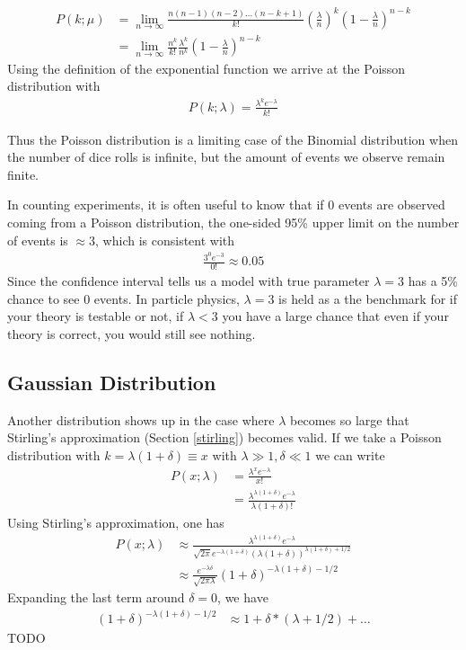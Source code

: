\begin{align}
P(k; \mu) &= \lim_{n\to \infty} \frac{n(n-1)(n-2)...(n-k+1)}{k!}\left(\frac{\lambda}{n}\right)^k\left(1-\frac{\lambda}{n}\right)^{n-k}\\
&= \lim_{n\to \infty}\frac{n^k}{k!}\frac{\lambda^k}{n^k}\left(1-\frac{\lambda}{n}\right)^{n-k}
\end{align}
Using the definition of the exponential function we arrive at the Poisson distribution with
\begin{align}
P(k; \lambda) = \frac{\lambda^ke^{-\lambda}}{k!}
\end{align}

Thus the Poisson distribution is a limiting case of the Binomial distribution when the number of dice rolls is infinite, but the amount of events we observe remain finite.

In counting experiments, it is often useful to know that if 0 events are observed coming from a Poisson distribution, the one-sided 95\% upper limit on the number of events is $\approx 3$, which is consistent with
\begin{align}
	\frac{3^0e^{-3}}{0!} \approx 0.05
\end{align}
Since the confidence interval tells us a model with true parameter $\lambda=3$ has a 5\% chance to see 0 events. In particle physics, $\lambda=3$ is held as a the benchmark for if your theory is testable or not, if $\lambda < 3$ you have a large chance that even if your theory is correct, you would still see nothing. 



\subsection{Gaussian Distribution}
Another distribution shows up in the case where $\lambda$ becomes so large that Stirling's approximation (Section \ref{stirling}) becomes valid. If we take a Poisson distribution with  $k = \lambda(1+\delta) \equiv x$ with $\lambda \gg 1, \delta \ll 1$ we can write
\begin{align}
	P(x; \lambda) &= \frac{\lambda^xe^{-\lambda}}{x!}\\
	&= \frac{\lambda^{\lambda(1+\delta)}e^{-\lambda}}{\lambda(1+\delta)!}
\end{align}
Using Stirling's approximation, one has
\begin{align}
		P(x; \lambda) &\approx \frac{\lambda^{\lambda(1+\delta)}e^{-\lambda}}{\sqrt{2\pi}e^{-\lambda(1+\delta)}(\lambda(1+\delta))^{\lambda(1+\delta)+1/2}}\\
		&\approx \frac{e^{-\lambda\delta}}{\sqrt{2\pi\lambda}} (1+\delta)^{-\lambda(1+\delta)-1/2}
\end{align}
Expanding the last term around $\delta=0$, we have
\begin{align}
	(1+\delta)^{-\lambda(1+\delta)-1/2} &\approx 1 + \delta*(\lambda+1/2) + \dots
\end{align} 
TODO

